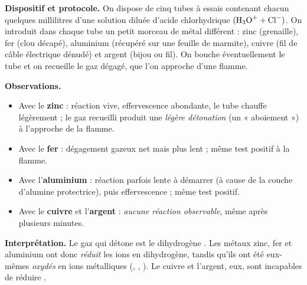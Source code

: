 \documentclass[11pt]{article}
\newcommand{\cle}[1]{{\popxbold\color{popdark}#1}}
\begin{document}
\begin{experience}
\textbf{Dispositif et protocole.} On dispose de cinq tubes à essais contenant chacun quelques millilitres d'une solution diluée d'acide chlorhydrique $(\ce{H3O+} + \ce{Cl-})$. On introduit dans chaque tube un petit morceau de métal différent : zinc (grenaille), fer (clou décapé), aluminium (récupéré sur une feuille de marmite), cuivre (fil de câble électrique dénudé) et argent (bijou ou fil). On bouche éventuellement le tube et on recueille le gaz dégagé, que l'on approche d'une flamme.

\textbf{Observations.}
\begin{itemize}
\item Avec le \textbf{zinc} : réaction vive, effervescence abondante, le tube chauffe légèrement ; le gaz recueilli produit une \emph{légère détonation} (un « aboiement ») à l'approche de la flamme.
\item Avec le \textbf{fer} : dégagement gazeux net mais plus lent ; même test positif à la flamme.
\item Avec l'\textbf{aluminium} : réaction parfois lente à démarrer (à cause de la couche d'alumine protectrice), puis effervescence ; même test positif.
\item Avec le \textbf{cuivre} et l'\textbf{argent} : \emph{aucune réaction observable}, même après plusieurs minutes.
\end{itemize}

\textbf{Interprétation.} Le gaz qui détone est le \cle{dihydrogène} . Les métaux zinc, fer et aluminium ont donc \emph{réduit} les ions  en dihydrogène, tandis qu'ils ont été eux-mêmes \emph{oxydés} en ions métalliques (, , ). Le cuivre et l'argent, eux, sont incapables de réduire .
\end{experience}
\end{document}

